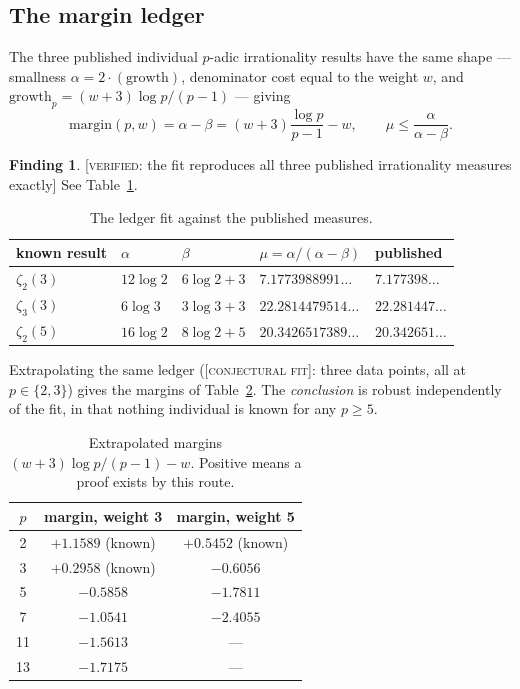 \documentclass[11pt,reqno]{article}
\newcommand{\VER}[1]{{\normalfont\textsc{[verified:} #1\textsc{]}}}
\newcommand{\FIT}{{\normalfont\textsc{[conjectural fit]}}}
\theoremstyle{plain}
\theoremstyle{definition}
\newtheorem{finding}[theorem]{Finding}
\theoremstyle{remark}
\numberwithin{equation}{section}
\begin{document}
\subsection{The margin ledger}\label{app:margin}

The three published individual $p$-adic irrationality results have the same
shape --- smallness $\alpha=2\cdot(\text{growth})$, denominator cost equal to
the weight $w$, and $\text{growth}_p=(w+3)\log p/(p-1)$ --- giving
\[
  \mathrm{margin}(p,w)=\alpha-\beta=(w+3)\frac{\log p}{p-1}-w,
  \qquad \mu\le\frac{\alpha}{\alpha-\beta}.
\]

\begin{finding}\label{find:ledgerfit}
\VER{the fit reproduces all three published irrationality measures exactly}
See Table~\ref{tab:ledger}.
\end{finding}

\begin{table}[h]
\centering\small
\caption{The ledger fit against the published measures.}
\label{tab:ledger}
\begin{tabular}{@{}lllll@{}}
\toprule
known result & $\alpha$ & $\beta$ & $\mu=\alpha/(\alpha-\beta)$ & published\\
\midrule
$\zeta_2(3)$ \cite{Beukers2008,Calegari2005} & $12\log2$ & $6\log2+3$ & $7.1773988991\dots$ & $7.177398\dots$\\
$\zeta_3(3)$ \cite{Beukers2008,Calegari2005} & $6\log3$ & $3\log3+3$ & $22.2814479514\dots$ & $22.281447\dots$\\
$\zeta_2(5)$ \cite{LSZ2025} & $16\log2$ & $8\log2+5$ & $20.3426517389\dots$ & $20.342651\dots$\\
\bottomrule
\end{tabular}
\end{table}

Extrapolating the same ledger (\FIT: three data points, all at $p\in\{2,3\}$)
gives the margins of Table~\ref{tab:margins}.  The \emph{conclusion} is robust
independently of the fit, in that nothing individual is known for any $p\ge5$.

\begin{table}[h]
\centering\small
\caption{Extrapolated margins $(w+3)\log p/(p-1)-w$.  Positive means a proof
exists by this route.}
\label{tab:margins}
\begin{tabular}{@{}ccc@{}}
\toprule
$p$ & margin, weight 3 & margin, weight 5\\
\midrule
2 & $+1.1589$ (known) & $+0.5452$ (known)\\
3 & $+0.2958$ (known) & $-0.6056$\\
5 & $-0.5858$ & $-1.7811$\\
7 & $-1.0541$ & $-2.4055$\\
11 & $-1.5613$ & ---\\
13 & $-1.7175$ & ---\\
\bottomrule
\end{tabular}
\end{table}
\end{document}
